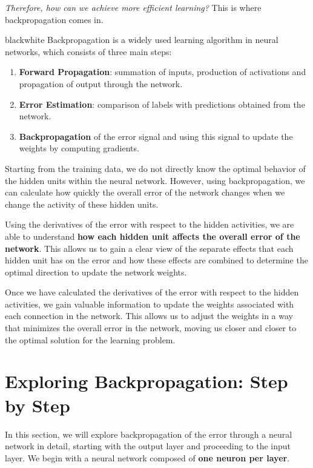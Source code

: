 \textit{Therefore, how can we achieve more efficient learning?} This is where backpropagation comes in.

\begin{remark}{black}{white}
Backpropagation is a widely used learning algorithm in neural networks, which consists of three main steps:

\begin{enumerate}
    \item \textbf{Forward Propagation}: summation of inputs, production of activations and propagation of output through the network.

    \item \textbf{Error Estimation}: comparison of labels with predictions obtained from the network.

    \item \textbf{Backpropagation} of the error signal and using this signal to update the weights by computing gradients.
\end{enumerate}
\end{remark}

Starting from the training data, we do not directly know the optimal behavior of the hidden units within the neural network. However, using backpropagation, we can calculate how quickly the overall error of the network changes when we change the activity of these hidden units.

Using the derivatives of the error with respect to the hidden activities, we are able to understand \textbf{how each hidden unit affects the overall error of the network}. This allows us to gain a clear view of the separate effects that each hidden unit has on the error and how these effects are combined to determine the optimal direction to update the network weights.

Once we have calculated the derivatives of the error with respect to the hidden activities, we gain valuable information to update the weights associated with each connection in the network. This allows us to adjust the weights in a way that minimizes the overall error in the network, moving us closer and closer to the optimal solution for the learning problem.

\section{Exploring Backpropagation: Step by Step}

In this section, we will explore backpropagation of the error through a neural network in detail, starting with the output layer and proceeding to the input layer. We begin with a neural network composed of \textbf{one neuron per layer}.

